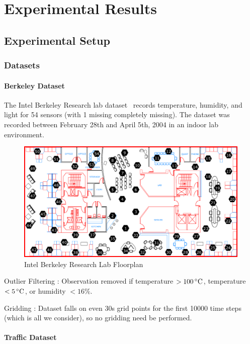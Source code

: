 \section{Experimental Results}  \label{sec:exp}

\subsection{Experimental Setup}

\subsubsection{Datasets}

\paragraph*{Berkeley Dataset}

The Intel Berkeley Research lab dataset~\cite{berkeley2004lab} records temperature, humidity, and light for 54 sensors (with 1 missing completely missing).
The dataset was recorded between February 28th and April 5th, 2004 in an indoor lab environment.

\begin{figure}[H]
\centering
\includegraphics[scale=0.25]{berkeley_lab.png}
\caption{Intel Berkeley Research Lab Floorplan}
\end{figure}

Outlier Filtering : Observation removed if temperature $> 100\,^{\circ}\mathrm{C}$, temperature $< 5\,^{\circ}\mathrm{C}$, or humidity $< 16\%$.

Gridding : Dataset falls on even 30s grid points for the first 10000 time steps (which is all we consider), so no gridding need be performed.

\paragraph*{Traffic Dataset}

